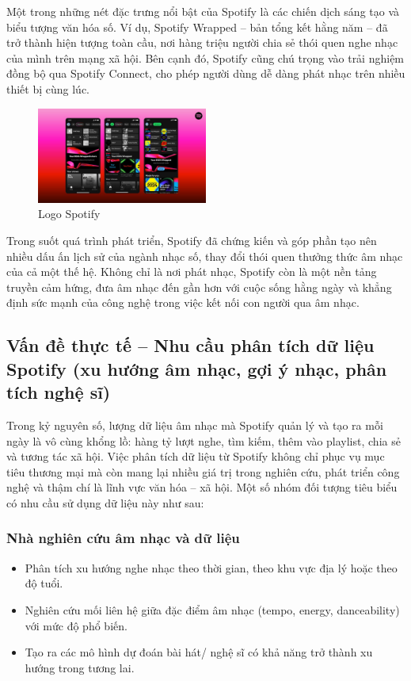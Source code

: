 \documentclass{latex/hcmut-report}
\begin{document}
Một trong những nét đặc trưng nổi bật của Spotify là các chiến dịch sáng tạo và biểu tượng văn hóa số. Ví dụ, Spotify Wrapped – bản tổng kết hằng năm – đã trở thành hiện tượng toàn cầu, nơi hàng triệu người chia sẻ thói quen nghe nhạc của mình trên mạng xã hội. Bên cạnh đó, Spotify cũng chú trọng vào trải nghiệm đồng bộ qua Spotify Connect, cho phép người dùng dễ dàng phát nhạc trên nhiều thiết bị cùng lúc.\\
\begin{figure}[h] %
    \centering %
    \includegraphics[width=0.5\textwidth]{graphics/spotify_wrapped.png} %
    \caption{Logo Spotify} %
    \label{fig:example} %
\end{figure}

Trong suốt quá trình phát triển, Spotify đã chứng kiến và góp phần tạo nên nhiều dấu ấn lịch sử của ngành nhạc số, thay đổi thói quen thưởng thức âm nhạc của cả một thế hệ. Không chỉ là nơi phát nhạc, Spotify còn là một nền tảng truyền cảm hứng, đưa âm nhạc đến gần hơn với cuộc sống hằng ngày và khẳng định sức mạnh của công nghệ trong việc kết nối con người qua âm nhạc.\\
\subsection{Vấn đề thực tế – Nhu cầu phân tích dữ liệu Spotify (xu hướng âm nhạc, gợi ý nhạc, phân tích nghệ sĩ)}
Trong kỷ nguyên số, lượng dữ liệu âm nhạc mà Spotify quản lý và tạo ra mỗi ngày là vô cùng khổng lồ: hàng tỷ lượt nghe, tìm kiếm, thêm vào playlist, chia sẻ và tương tác xã hội. Việc phân tích dữ liệu từ Spotify không chỉ phục vụ mục tiêu thương mại mà còn mang lại nhiều giá trị trong nghiên cứu, phát triển công nghệ và thậm chí là lĩnh vực văn hóa – xã hội. Một số nhóm đối tượng tiêu biểu có nhu cầu sử dụng dữ liệu này như sau:\\
\subsubsection{Nhà nghiên cứu âm nhạc và dữ liệu}
\begin{itemize}
    \item Phân tích xu hướng nghe nhạc theo thời gian, theo khu vực địa lý hoặc theo độ tuổi.

    \item Nghiên cứu mối liên hệ giữa đặc điểm âm nhạc (tempo, energy, danceability) với mức độ phổ biến.

    \item Tạo ra các mô hình dự đoán bài hát/ nghệ sĩ có khả năng trở thành xu hướng trong tương lai.
\end{itemize}
\end{document}
